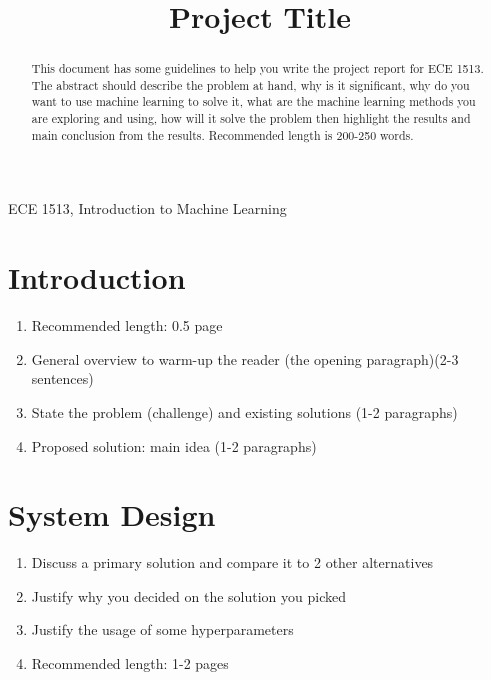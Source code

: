 \documentclass[conference]{IEEEtran}
\begin{document}
\title{Project Title}

\author{
}

\maketitle

\begin{abstract}
    This document has some guidelines to help you write the project report for ECE 1513. The abstract should describe the problem at hand, why is it significant, why do you want to use machine learning to solve it, what are the machine learning methods you are exploring and using, how will it solve the problem then highlight the results and main conclusion from the results. Recommended length is 200-250 words. 
\end{abstract}

\begin{IEEEkeywords}
    ECE 1513, Introduction to Machine Learning
\end{IEEEkeywords}

\section{Introduction}
\begin{enumerate}
    \item Recommended length: 0.5 page

    \item General overview to warm-up the reader (the opening paragraph)(2-3 sentences)

    \item State the problem (challenge) and existing solutions (1-2 paragraphs)

    \item Proposed solution: main idea (1-2 paragraphs)
\end{enumerate}

\section{System Design}
\begin{enumerate}
    \item Discuss a primary solution and compare it to 2 other alternatives

    \item Justify why you decided on the solution you picked

    \item Justify the usage of some hyperparameters

    \item Recommended length: 1-2 pages
\end{enumerate}
\end{document}
